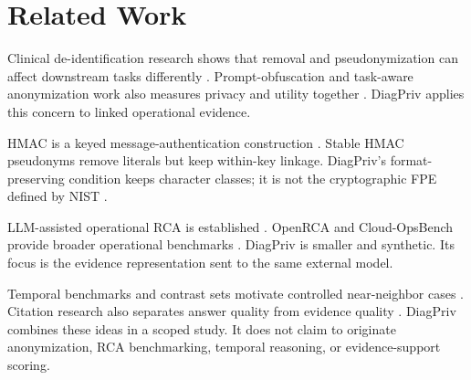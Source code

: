 \section{Related Work}
\label{sec:related}
Clinical de-identification research shows that removal and pseudonymization
can affect downstream tasks differently
\cite{berg2020impact,bencheikhlarbi2023clinical,singh2025redactor}.
Prompt-obfuscation and task-aware anonymization work also measures privacy and
utility together
\cite{pasch2025balancing,lin2025emojiprompt,loiseau2025taueval,loiseau2026adaptive}.
DiagPriv applies this concern to linked operational evidence.

HMAC is a keyed message-authentication construction
\cite{krawczyk1997hmac}. Stable HMAC pseudonyms remove literals but keep
within-key linkage. DiagPriv's format-preserving condition keeps character
classes; it is not the cryptographic FPE defined by NIST
\cite{dworkin2016fpe}.

LLM-assisted operational RCA is established
\cite{ahmed2023recommending,chen2024automatic,wang2024rcagent,xu2025openrca}.
OpenRCA and Cloud-OpsBench provide broader operational benchmarks
\cite{xu2025openrca,wang2026cloudopsbench}. DiagPriv is smaller and synthetic.
Its focus is the evidence representation sent to the same external model.

Temporal benchmarks and contrast sets motivate controlled near-neighbor cases
\cite{chu2024timebench,gardner2020contrast}. Citation research also separates
answer quality from evidence quality
\cite{gao2023citations,zhang2024finegrained}. DiagPriv combines these ideas in
a scoped study. It does not claim to originate anonymization, RCA
benchmarking, temporal reasoning, or evidence-support scoring.
